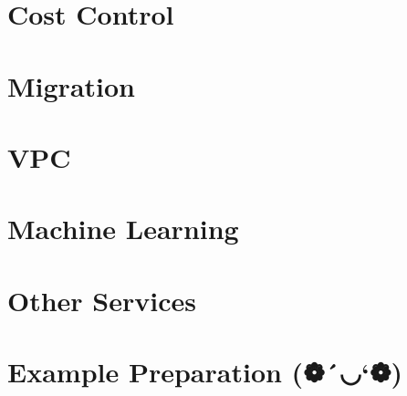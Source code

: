 \documentclass[11pt]{article}
\begin{document}
    \chapter{Cost Control}
    \chapter{Migration}
    \chapter{VPC}
    \chapter{Machine Learning}
    \chapter{Other Services}
    \chapter{Example Preparation (❁´◡`❁)}
\end{document}

